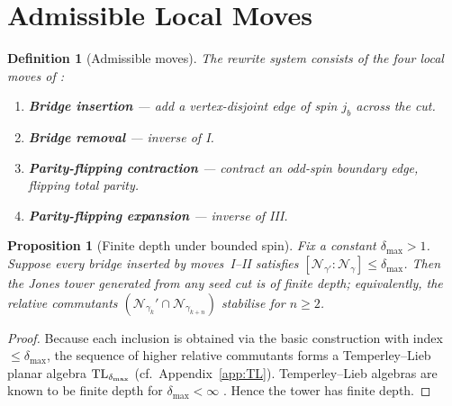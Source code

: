 \documentclass[11pt]{article}
\newtheorem{definition}{Definition}[section]
\newtheorem{proposition}{Proposition}[section]
\begin{document}
\section{Admissible Local Moves}

\begin{definition}[Admissible moves]\label{def:moves}
The rewrite system consists of the four local moves of \cite{EntropyMono}:
\begin{enumerate}
\item[\textbf{I.}] \textbf{Bridge insertion} — add a vertex-disjoint edge of spin
      $j_b$ across the cut.
\item[\textbf{II.}] \textbf{Bridge removal} — inverse of I.
\item[\textbf{III.}] \textbf{Parity-flipping contraction} — contract an odd-spin
      boundary edge, flipping total parity.
\item[\textbf{IV.}] \textbf{Parity-flipping expansion} — inverse of III.
\end{enumerate}
\end{definition}

\begin{proposition}[Finite depth under bounded spin]\label{prop:finitedepth}
Fix a constant $\delta_{\max}\!>\!1$.  
Suppose every bridge inserted by moves~I–II satisfies 
$[\mathcal N_{\gamma'}:\mathcal N_{\gamma}]\le \delta_{\max}$.  
Then the Jones tower generated from any seed cut is of finite depth; 
equivalently, the relative commutants 
$(\mathcal N_{\gamma_k}'\!\cap\mathcal N_{\gamma_{k+n}})$ stabilise for $n\ge 2$.
\end{proposition}

\begin{proof}
Because each inclusion is obtained via the basic construction with
index $\le\delta_{\max}$, the sequence of higher relative commutants
forms a Temperley--Lieb planar algebra ${\rm TL}_{\delta_{\max}}$
(cf.\ Appendix~\ref{app:TL}).  
Temperley--Lieb algebras are known to be finite depth for 
$\delta_{\max}\!<\!\infty$ \cite[Prop.~2.2]{JonesTL}.  Hence the tower
has finite depth.
\end{proof}
\end{document}
